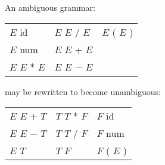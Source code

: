 \begin{slide*}
An ambiguous grammar:

\begin{tabular}{l@{~~~~~~}l@{~~~~~~}l}
$E$ \RA{} id & $E$ \RA{} $E$ $/$ $E$ & $E$ \RA{} ( $E$ )\\
$E$ \RA{} num & $E$ \RA{} $E$ + $E$ & \\
$E$ \RA{} $E$ $*$ $E$ & $E$ \RA{} $E$ $-$ $E$ & 
\end{tabular}

may be rewritten to become unambiguous:

\begin{tabular}{l@{~~~~~~}l@{~~~~~~}l}
$E$ \RA{} $E$ + $T$ & $T$ \RA{} $T$ $*$ $F$ & $F$ \RA{} id\\
$E$ \RA{} $E$ $-$ $T$ & $T$ \RA{} $T$ $/$ $F$ & $F$ \RA{} num\\
$E$ \RA{} $T$ & $T$ \RA{} $F$ & $F$ \RA{} ( $E$ ) \\
\end{tabular}


\end{slide*}
